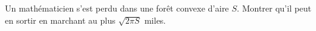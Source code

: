 Un mathématicien s'est perdu dans une forêt convexe d'aire $S$. Montrer qu'il peut en sortir en marchant au plus $\sqrt{2\pi S}$ miles.
